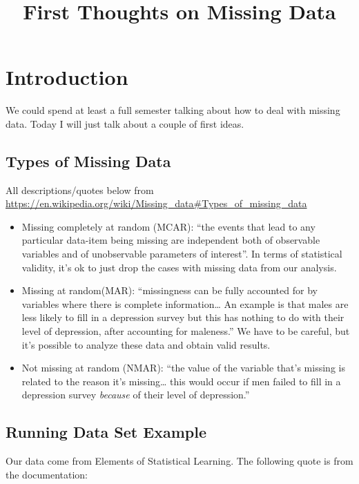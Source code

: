 \documentclass[]{article}
\title{First Thoughts on Missing Data}
\author{}
\date{}
\providecommand{\tightlist}{%
  \setlength{\itemsep}{0pt}\setlength{\parskip}{0pt}}
\begin{document}
\maketitle

\section{Introduction}\label{introduction}

We could spend at least a full semester talking about how to deal with
missing data. Today I will just talk about a couple of first ideas.

\subsection{Types of Missing Data}\label{types-of-missing-data}

All descriptions/quotes below from
\url{https://en.wikipedia.org/wiki/Missing_data\#Types_of_missing_data}

\begin{itemize}
\tightlist
\item
  Missing completely at random (MCAR): ``the events that lead to any
  particular data-item being missing are independent both of observable
  variables and of unobservable parameters of interest''. In terms of
  statistical validity, it's ok to just drop the cases with missing data
  from our analysis.
\item
  Missing at random(MAR): ``missingness can be fully accounted for by
  variables where there is complete information\ldots{} An example is
  that males are less likely to fill in a depression survey but this has
  nothing to do with their level of depression, after accounting for
  maleness.'' We have to be careful, but it's possible to analyze these
  data and obtain valid results.
\item
  Not missing at random (NMAR): ``the value of the variable that's
  missing is related to the reason it's missing\ldots{} this would occur
  if men failed to fill in a depression survey \emph{because} of their
  level of depression.''
\end{itemize}

\subsection{Running Data Set Example}\label{running-data-set-example}

Our data come from Elements of Statistical Learning. The following quote
is from the documentation:
\end{document}
